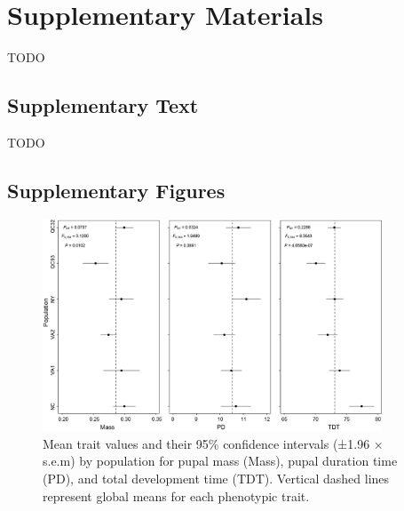 \documentclass[smallextended]{svjour3}
\newcommand{\beginsupplement}{%
        \setcounter{table}{0}
        \renewcommand{\thetable}{S\arabic{table}}
        \setcounter{figure}{0}
        \renewcommand{\thefigure}{S\arabic{figure}}
        \renewcommand{\thesection}{S\arabic{section}}
        \renewcommand{\thesubsection}{S\arabic{subsection}}
     }
\begin{document}
\clearpage


\beginsupplement%

\section*{Supplementary Materials}
TODO

\subsection*{Supplementary Text}\label{ss:supp}

TODO


%

\subsection*{Supplementary Figures}\label{ss:sfig}

\begin{figure}[h]
\centering
\includegraphics[width=0.9\textwidth]{media/image1.png}
\caption{Mean trait values and their 95\% confidence
intervals (±1.96 × s.e.m) by population for pupal mass (Mass), pupal
duration time (PD), and total development time (TDT). Vertical dashed
lines represent global means for each phenotypic trait.}
\label{fig:trait}
\end{figure}

\newpage
\end{document}
